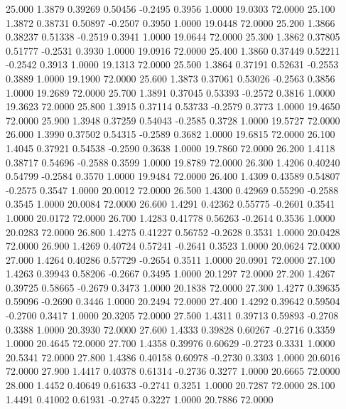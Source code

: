   25.000   1.3879   0.39269   0.50456  -0.2495   0.3956   1.0000  19.0303  72.0000
  25.100   1.3872   0.38731   0.50897  -0.2507   0.3950   1.0000  19.0448  72.0000
  25.200   1.3866   0.38237   0.51338  -0.2519   0.3941   1.0000  19.0644  72.0000
  25.300   1.3862   0.37805   0.51777  -0.2531   0.3930   1.0000  19.0916  72.0000
  25.400   1.3860   0.37449   0.52211  -0.2542   0.3913   1.0000  19.1313  72.0000
  25.500   1.3864   0.37191   0.52631  -0.2553   0.3889   1.0000  19.1900  72.0000
  25.600   1.3873   0.37061   0.53026  -0.2563   0.3856   1.0000  19.2689  72.0000
  25.700   1.3891   0.37045   0.53393  -0.2572   0.3816   1.0000  19.3623  72.0000
  25.800   1.3915   0.37114   0.53733  -0.2579   0.3773   1.0000  19.4650  72.0000
  25.900   1.3948   0.37259   0.54043  -0.2585   0.3728   1.0000  19.5727  72.0000
  26.000   1.3990   0.37502   0.54315  -0.2589   0.3682   1.0000  19.6815  72.0000
  26.100   1.4045   0.37921   0.54538  -0.2590   0.3638   1.0000  19.7860  72.0000
  26.200   1.4118   0.38717   0.54696  -0.2588   0.3599   1.0000  19.8789  72.0000
  26.300   1.4206   0.40240   0.54799  -0.2584   0.3570   1.0000  19.9484  72.0000
  26.400   1.4309   0.43589   0.54807  -0.2575   0.3547   1.0000  20.0012  72.0000
  26.500   1.4300   0.42969   0.55290  -0.2588   0.3545   1.0000  20.0084  72.0000
  26.600   1.4291   0.42362   0.55775  -0.2601   0.3541   1.0000  20.0172  72.0000
  26.700   1.4283   0.41778   0.56263  -0.2614   0.3536   1.0000  20.0283  72.0000
  26.800   1.4275   0.41227   0.56752  -0.2628   0.3531   1.0000  20.0428  72.0000
  26.900   1.4269   0.40724   0.57241  -0.2641   0.3523   1.0000  20.0624  72.0000
  27.000   1.4264   0.40286   0.57729  -0.2654   0.3511   1.0000  20.0901  72.0000
  27.100   1.4263   0.39943   0.58206  -0.2667   0.3495   1.0000  20.1297  72.0000
  27.200   1.4267   0.39725   0.58665  -0.2679   0.3473   1.0000  20.1838  72.0000
  27.300   1.4277   0.39635   0.59096  -0.2690   0.3446   1.0000  20.2494  72.0000
  27.400   1.4292   0.39642   0.59504  -0.2700   0.3417   1.0000  20.3205  72.0000
  27.500   1.4311   0.39713   0.59893  -0.2708   0.3388   1.0000  20.3930  72.0000
  27.600   1.4333   0.39828   0.60267  -0.2716   0.3359   1.0000  20.4645  72.0000
  27.700   1.4358   0.39976   0.60629  -0.2723   0.3331   1.0000  20.5341  72.0000
  27.800   1.4386   0.40158   0.60978  -0.2730   0.3303   1.0000  20.6016  72.0000
  27.900   1.4417   0.40378   0.61314  -0.2736   0.3277   1.0000  20.6665  72.0000
  28.000   1.4452   0.40649   0.61633  -0.2741   0.3251   1.0000  20.7287  72.0000
  28.100   1.4491   0.41002   0.61931  -0.2745   0.3227   1.0000  20.7886  72.0000

